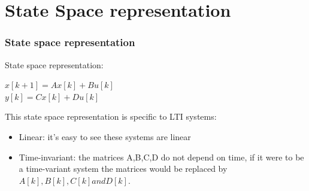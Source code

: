 \section{State Space representation}
\begin{frame}
	\frametitle{State space representation}
	\begin{definition}
		State space representation:
		\begin{center}
			$x[k+1] = A x[k] + B u[k]$ \\
			$y[k] = C x[k] + D u[k] $ \\
		\end{center}
		This state space representation is specific to LTI systems:\\
		\begin{itemize}
			\item Linear: it’s easy to see these systems are linear
			\item Time-invariant: the matrices A,B,C,D do not depend on time, if it were to be a time-variant system the matrices would be replaced by $A[k], B[k], C[k] and D[k]$.
		\end{itemize}
	\end{definition}
\end{frame}

